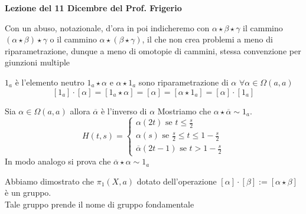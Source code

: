 

\textbf{Lezione del 11 Dicembre del Prof. Frigerio}
\begin{oss}Con un abuso, notazionale, d'ora in poi indicheremo con $\alpha\star \beta \star \gamma$ il cammino $( \alpha \star \beta) \star \gamma$ o il cammino $\alpha \star ( \beta \star \gamma)$, il che non crea problemi a meno di riparametrazione, dunque a meno di omotopie di cammini, stessa convenzione per giunzioni multiple 
\end{oss}
\begin{lem}$1_a$ \`e l'elemento neutro
\proof
$1_a \star \alpha$ e $\alpha \star 1_a$ sono riparametrazione di $\alpha $ $\forall \alpha \in \Omega(a,a)$
$$ [1_a] \cdot [\alpha] = [1_a \star \alpha] = [\alpha] = [ \alpha \star 1_a] = [\alpha]\cdot  [1_a]$$
\end{lem}
\begin{lem}Sia $\alpha\in \Omega(a,a)$ allora $\overline{\alpha}$ \`e l'inverso di $\alpha$
\proof Mostriamo che $\alpha \star \overline{\alpha}\sim 1_a$.
$$H(t,s)=\begin{cases}\alpha(2t) \text{ se } t \leq \frac{s}{2}\\ \alpha(s) \text{ se } \frac{s}{2}\leq t \leq 1 - \frac{s}{2}\\
\overline{\alpha}(2t-1) \text{ se } t> 1 - \frac{s}{2}
\end{cases}$$
In modo analogo si prova che $\overline{\alpha}\star \alpha \sim 1_a$
\endproof
\end{lem}
\begin{thm}Abbiamo dimostrato che $\pi_1(X,a)$ dotato dell'operazione $[\alpha]\cdot [\beta] := [\alpha\star \beta]$ \`e un gruppo.\\
Tale gruppo prende il nome di gruppo fondamentale
\end{thm}

